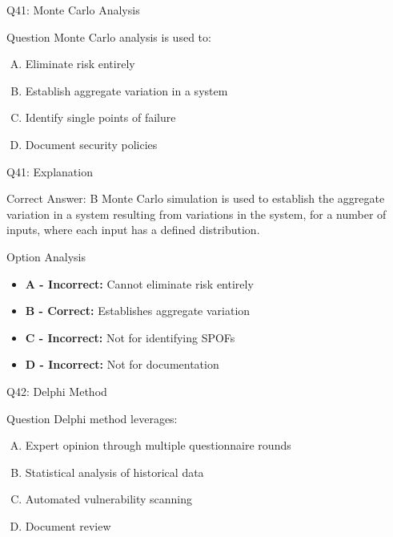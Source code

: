 \documentclass{beamer}
\begin{document}
	\begin{frame}{Q41: Monte Carlo Analysis}
		\begin{block}{Question}
			Monte Carlo analysis is used to:
		\end{block}
		\begin{enumerate}[(A)]
			\item Eliminate risk entirely
			\item Establish aggregate variation in a system
			\item Identify single points of failure
			\item Document security policies
		\end{enumerate}
	\end{frame}
	
	\begin{frame}{Q41: Explanation}
		\begin{block}{Correct Answer: B}
			Monte Carlo simulation is used to establish the aggregate variation in a system resulting from variations in the system, for a number of inputs, where each input has a defined distribution.
		\end{block}
		\begin{block}{Option Analysis}
			\begin{itemize}
				\item \textbf{A - Incorrect:} Cannot eliminate risk entirely
				\item \textbf{B - Correct:} Establishes aggregate variation
				\item \textbf{C - Incorrect:} Not for identifying SPOFs
				\item \textbf{D - Incorrect:} Not for documentation
			\end{itemize}
		\end{block}
	\end{frame}
	
	\begin{frame}{Q42: Delphi Method}
		\begin{block}{Question}
			Delphi method leverages:
		\end{block}
		\begin{enumerate}[(A)]
			\item Expert opinion through multiple questionnaire rounds
			\item Statistical analysis of historical data
			\item Automated vulnerability scanning
			\item Document review
		\end{enumerate}
	\end{frame}
	
\end{document}
